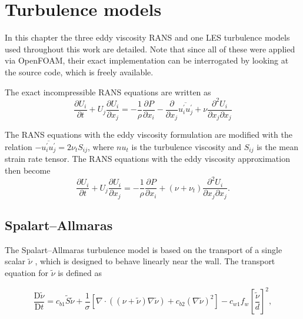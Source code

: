 \chapter{Turbulence models}
\doublespace

In this chapter the three eddy viscosity RANS and one LES turbulence models used
throughout this work are detailed. Note that since all of these were applied via
OpenFOAM, their exact implementation can be interrogated by looking at the
source code, which is freely available.

The exact incompressible RANS equations are written as
\begin{equation}
    \frac{\partial U_i}{\partial t}
    + U_j \frac{\partial U_i}{\partial x_j}
    =
    -\frac{1}{\rho}\frac{\partial P}{\partial x_i}
    - \frac{\partial}{\partial x_j} \overline{u_i^\prime u_j^\prime}
    + \nu \frac{\partial^2 U_i}{\partial x_j \partial x_j}
\end{equation}

The RANS equations with the eddy viscosity formulation are modified with the
relation $-\overline{u_i^\prime u_j^\prime} = 2 \nu_t S_{ij}$, where $nu_t$ is
the turbulence viscosity and $S_{ij}$ is the mean strain rate tensor. The RANS
equations with the eddy viscosity approximation then become
\begin{equation}
    \frac{\partial U_i}{\partial t}
    + U_j \frac{\partial U_i}{\partial x_j}
    =
    -\frac{1}{\rho}\frac{\partial P}{\partial x_i}
    + (\nu + \nu_t) \frac{\partial^2 U_i}{\partial x_j \partial x_j}.
\end{equation}


\section{Spalart--Allmaras}

The Spalart--Allmaras turbulence model is based on the transport of a single
scalar $\tilde{\nu}$ \cite{Spalart1992}, which is designed to behave linearly
near the wall. The transport equation for $\tilde{\nu}$ is defined as

\begin{equation}
    \frac{\mathrm{D} \tilde{\nu}}{\mathrm{D} t}
    = c_{b1} \tilde{S} \tilde{\nu}
    + \frac{1}{\sigma}
    \left[
    \nabla \cdot \left( (\nu + \tilde{\nu}) \nabla \tilde{\nu} \right)
    + c_{b2} (\nabla \tilde{\nu})^2
    \right]
    - c_{w1} f_w \left[ \frac{\tilde{\nu}}{d} \right]^2,
    \label{eq:SA-nutilde}
\end{equation}

